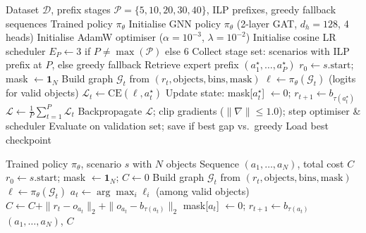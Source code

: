 \documentclass[conference]{IEEEtran}
\begin{document}
\begin{algorithm}[htbp]
\caption{Curriculum-Based Imitation Learning}
\label{alg:training}
\begin{algorithmic}[1]
\REQUIRE Dataset $\mathcal{D}$, prefix stages $\mathcal{P}{=}\{5,10,20,30,40\}$, ILP prefixes, greedy fallback sequences
\ENSURE Trained policy $\pi_\theta$
\STATE Initialise GNN policy $\pi_\theta$ (2-layer GAT, $d_h{=}128$, 4 heads)
\STATE Initialise AdamW optimiser ($\alpha{=}10^{-3}$, $\lambda{=}10^{-2}$)
\STATE Initialise cosine LR scheduler
    \STATE $E_P \leftarrow 3$ if $P \neq \max(\mathcal{P})$ else $6$
    \STATE Collect stage set: scenarios with ILP prefix at $P$, else greedy fallback
            \STATE Retrieve expert prefix $(a_1^\star, \dots, a_P^\star)$
            \STATE $r_0 \leftarrow s.\text{start}$; mask $\leftarrow \mathbf{1}_N$
                \STATE Build graph $\mathcal{G}_t$ from $(r_t, \text{objects}, \text{bins}, \text{mask})$
                \STATE $\ell \leftarrow \pi_\theta(\mathcal{G}_t)$ \quad (logits for valid objects)
                \STATE $\mathcal{L}_t \leftarrow \text{CE}(\ell, a_t^\star)$
                \STATE Update state: mask[$a_t^\star$] $\leftarrow 0$; $r_{t+1} \leftarrow b_{\tau(a_t^\star)}$
            \ENDFOR
            \STATE $\mathcal{L} \leftarrow \frac{1}{P}\sum_{t=1}^{P} \mathcal{L}_t$
            \STATE Backpropagate $\mathcal{L}$; clip gradients ($\|\nabla\|{\le}1.0$); step optimiser \& scheduler
        \ENDFOR
        \STATE Evaluate on validation set; save if best gap vs.\ greedy
    \ENDFOR
\ENDFOR
\STATE Load best checkpoint
\end{algorithmic}
\end{algorithm}

\begin{algorithm}[htbp]
\caption{Greedy Inference Rollout}
\label{alg:inference}
\begin{algorithmic}[1]
\REQUIRE Trained policy $\pi_\theta$, scenario $s$ with $N$ objects
\ENSURE Sequence $(a_1, \dots, a_N)$, total cost $C$
\STATE $r_0 \leftarrow s.\text{start}$; mask $\leftarrow \mathbf{1}_N$; $C \leftarrow 0$
    \STATE Build graph $\mathcal{G}_t$ from $(r_t, \text{objects}, \text{bins}, \text{mask})$
    \STATE $\ell \leftarrow \pi_\theta(\mathcal{G}_t)$
    \STATE $a_t \leftarrow \arg\max_i \ell_i$ \quad (among valid objects)
    \STATE $C \leftarrow C + \|r_t - o_{a_t}\|_2 + \|o_{a_t} - b_{\tau(a_t)}\|_2$
    \STATE mask[$a_t$] $\leftarrow 0$; $r_{t+1} \leftarrow b_{\tau(a_t)}$
\ENDFOR
\RETURN $(a_1, \dots, a_N)$, $C$
\end{algorithmic}
\end{algorithm}
\end{document}
